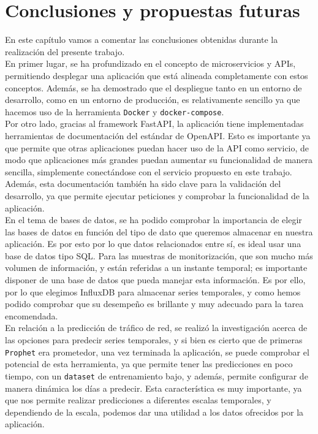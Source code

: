 \documentclass[a4paper, oneside, 12pt]{book}
\begin{document}
	\pagebreak
	
	\chapter{Conclusiones y propuestas futuras}
	
	\noindent En este capítulo vamos a comentar las conclusiones obtenidas durante la realización del presente trabajo. \\
	
	\noindent En primer lugar, se ha profundizado en el concepto de microservicios y APIs, permitiendo desplegar una aplicación que está alineada completamente con estos conceptos. Además, se ha demostrado que el despliegue tanto en un entorno de desarrollo, como en un entorno de producción, es relativamente sencillo ya que hacemos uso de la herramienta \texttt{Docker} y \texttt{docker-compose}. \\
	
	\noindent Por otro lado, gracias al framework FastAPI, la aplicación tiene implementadas herramientas de documentación del estándar de OpenAPI. Esto es importante ya que permite que otras aplicaciones puedan hacer uso de la API como servicio, de modo que aplicaciones más grandes puedan aumentar su funcionalidad de manera sencilla, simplemente conectándose con el servicio propuesto en este trabajo. Además, esta documentación también ha sido clave para la validación del desarrollo, ya que permite ejecutar peticiones y comprobar la funcionalidad de la aplicación. \\

	\noindent En el tema de bases de datos, se ha podido comprobar la importancia de elegir las bases de datos en función del tipo de dato que queremos almacenar en nuestra aplicación. Es por esto por lo que datos relacionados entre sí, es ideal usar una base de datos tipo SQL. Para las muestras de monitorización, que son mucho más volumen de información, y están referidas a un instante temporal; es importante disponer de una base de datos que pueda manejar esta información. Es por ello, por lo que elegimos InfluxDB para almacenar series temporales, y como hemos podido comprobar que su desempeño es brillante y muy adecuado para la tarea encomendada. \\
	
	\noindent En relación a la predicción de tráfico de red, se realizó la investigación acerca de las opciones para predecir series temporales, y si bien es cierto que de primeras \texttt{Prophet} era prometedor, una vez terminada la aplicación, se puede comprobar el potencial de esta herramienta, ya que permite tener las predicciones en poco tiempo, con un \texttt{dataset} de entrenamiento bajo, y además, permite configurar de manera dinámica los días a predecir. Esta característica es muy importante, ya que nos permite realizar predicciones a diferentes escalas temporales, y dependiendo de la escala, podemos dar una utilidad a los datos ofrecidos por la aplicación. \\
	
\end{document}
